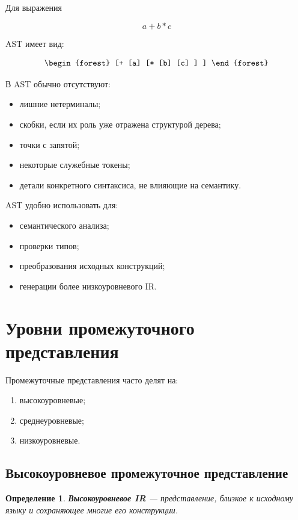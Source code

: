 \documentclass[12pt,a4paper]{article}
\newtheorem{definition}{Определение}
\begin{document}
Для выражения

\[
a + b * c
\]

AST имеет вид:

\[
\begin{forest}
[+
    [a]
    [*
        [b]
        [c]
    ]
]
\end{forest}
\]

В AST обычно отсутствуют:
\begin{itemize}
    \item лишние нетерминалы;
    \item скобки, если их роль уже отражена структурой дерева;
    \item точки с запятой;
    \item некоторые служебные токены;
    \item детали конкретного синтаксиса, не влияющие на семантику.
\end{itemize}

AST удобно использовать для:
\begin{itemize}
    \item семантического анализа;
    \item проверки типов;
    \item преобразования исходных конструкций;
    \item генерации более низкоуровневого IR.
\end{itemize}

\section{Уровни промежуточного представления}

Промежуточные представления часто делят на:
\begin{enumerate}
    \item высокоуровневые;
    \item среднеуровневые;
    \item низкоуровневые.
\end{enumerate}

\subsection{Высокоуровневое промежуточное представление}

\begin{definition}
\textbf{Высокоуровневое IR} --- представление, близкое к исходному языку и сохраняющее многие его конструкции.
\end{definition}
\end{document}
